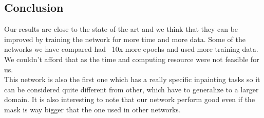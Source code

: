 \documentclass[10pt,twocolumn,letterpaper]{article}
\begin{document}
\subsection{Conclusion}
Our results are close to the state-of-the-art and we think that they can
be improved by training the network for more time and more data. Some of the networks we have compared
had ~10x more epochs and used more training data. We couldn't afford that as the time and
computing resource were not feasible for us.\\
This network is also the first one which has a really specific inpainting tasks so it
can be considered quite different from other, which have to generalize to a
larger domain. It is also interesting to note that our network perform good even
if the mask is way bigger that the one used in other networks.


{\small


}
\end{document}
